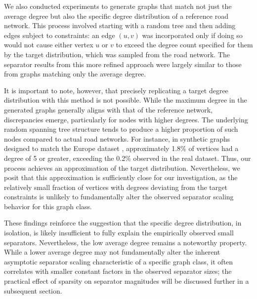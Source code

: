 We also conducted experiments to generate graphs that match not just the average degree but also the specific degree distribution of a reference road network.
This process involved starting with a random tree and then adding edges subject to constraints: an edge \((u, v)\) was incorporated only if doing so would not cause either vertex \(u\) or \(v\) to exceed the degree count specified for them by the target distribution, which was sampled from the road network.
The separator results from this more refined approach were largely similar to those from graphs matching only the average degree.

It is important to note, however, that precisely replicating a target degree distribution with this method is not possible.
While the maximum degree in the generated graphs generally aligns with that of the reference network, discrepancies emerge, particularly for nodes with higher degrees.
The underlying random spanning tree structure tends to produce a higher proportion of such nodes compared to actual road networks.
For instance, in synthetic graphs designed to match the Europe dataset \cite{ptv_group_dimacs-europe_2009}, approximately 1.8\% of vertices had a degree of 5 or greater, exceeding the 0.2\% observed in the real dataset.
Thus, our process achieves an approximation of the target distribution.
Nevertheless, we posit that this approximation is sufficiently close for our investigation, as the relatively small fraction of vertices with degrees deviating from the target constraints is unlikely to fundamentally alter the observed separator scaling behavior for this graph class.

These findings reinforce the suggestion that the specific degree distribution, in isolation, is likely insufficient to fully explain the empirically observed small separators.
Nevertheless, the low average degree remains a noteworthy property.
While a lower average degree may not fundamentally alter the inherent asymptotic separator scaling characteristic of a specific graph class, it often correlates with smaller constant factors in the observed separator sizes; the practical effect of sparsity on separator magnitudes will be discussed further in a subsequent section.

